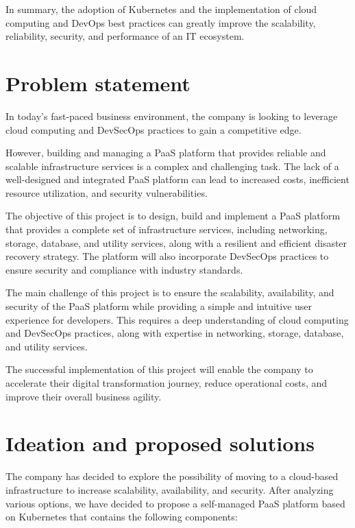 In summary, the adoption of Kubernetes and the implementation of cloud computing and DevOps best practices can greatly improve the scalability, reliability, security, and performance of an IT ecosystem. 

\section{Problem statement }

In today's fast-paced business environment, the company is looking to leverage cloud computing and DevSecOps practices to gain a competitive edge.  

However, building and managing a PaaS platform that provides reliable and scalable infrastructure services is a complex and challenging task. The lack of a well-designed and integrated PaaS platform can lead to increased costs, inefficient resource utilization, and security vulnerabilities. 

The objective of this project is to design, build and implement a PaaS platform that provides a complete set of infrastructure services, including networking, storage, database, and utility services, along with a resilient and efficient disaster recovery strategy. The platform will also incorporate DevSecOps practices to ensure security and compliance with industry standards. 

The main challenge of this project is to ensure the scalability, availability, and security of the PaaS platform while providing a simple and intuitive user experience for developers. This requires a deep understanding of cloud computing and DevSecOps practices, along with expertise in networking, storage, database, and utility services. 

The successful implementation of this project will enable the company to accelerate their digital transformation journey, reduce operational costs, and improve their overall business agility. 

 

\section{Ideation and proposed solutions} 

The company has decided to explore the possibility of moving to a cloud-based infrastructure to increase scalability, availability, and security. After analyzing various options, we have decided to propose a self-managed PaaS platform based on Kubernetes that contains the following components: 

